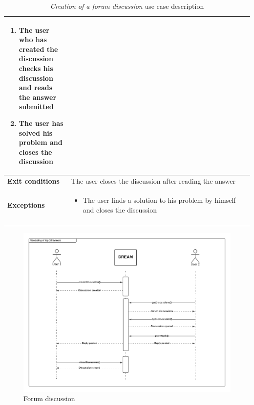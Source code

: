 \documentclass[10pt]{article}
\begin{document}
\begin{enumerate}[label=\textbf{UC\arabic*}]
\begin{longtable}{p{0.26\linewidth}p{0.75\linewidth}}
\begin{enumerate}
                \item The user who has created the discussion checks his discussion and reads the answer submitted
                \item The user has solved his problem and closes the discussion
            \end{enumerate} \\
            \midrule
            \textbf{Exit conditions} & The user closes the discussion after reading the answer\\
            \midrule
            \textbf{Exceptions} & 
            \begin{itemize}
                \item The user finds a solution to his problem by himself and closes the discussion 
            \end{itemize} \\
            \bottomrule
            \caption{\emph{Creation of a forum discussion} use case description}
        \end{longtable}
    \newpage

        \begin{figure}[h!]
            \centering
            \includegraphics[scale=0.423]{sequence/forum.png}
            \caption{Forum discussion}
        \end{figure}
    \end{enumerate}
\newpage
\end{document}
